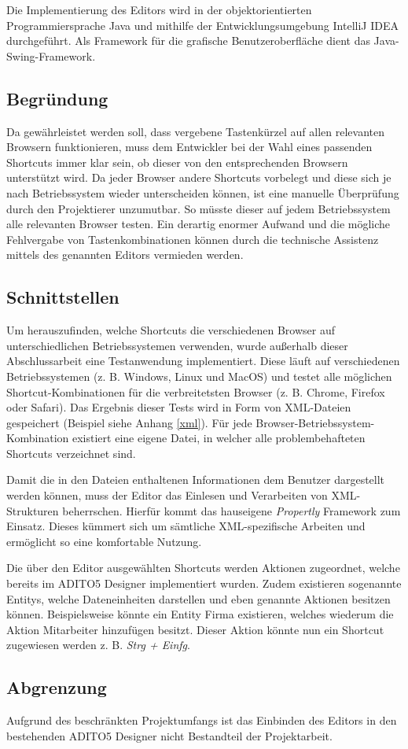 Die Implementierung des Editors wird in der objektorientierten Programmiersprache Java und mithilfe der Entwicklungsumgebung IntelliJ IDEA durchgeführt. Als Framework für die grafische Benutzeroberfläche dient das Java-Swing-Framework.

\subsection{Begründung}

Da gewährleistet werden soll, dass vergebene Tastenkürzel auf allen relevanten Browsern funktionieren, muss dem Entwickler bei der Wahl eines passenden Shortcuts immer klar sein, ob dieser von den entsprechenden Browsern unterstützt wird. Da jeder Browser andere Shortcuts vorbelegt und diese sich je nach Betriebssystem wieder unterscheiden können, ist eine manuelle Überprüfung durch den Projektierer unzumutbar. So müsste dieser auf jedem Betriebssystem alle relevanten Browser testen. Ein derartig enormer Aufwand und die mögliche Fehlvergabe von Tastenkombinationen können durch die technische Assistenz mittels des genannten Editors vermieden werden.

\subsection{Schnittstellen}
\label{schnittstellen} 

Um herauszufinden, welche Shortcuts die verschiedenen Browser auf unterschiedlichen Betriebssystemen verwenden, wurde außerhalb dieser Abschlussarbeit eine Testanwendung implementiert. Diese läuft auf verschiedenen Betriebssystemen (z. B. Windows, Linux und MacOS) und testet alle möglichen Shortcut-Kombinationen für die verbreitetsten Browser (z. B. Chrome, Firefox oder Safari). Das Ergebnis dieser Tests wird in Form von XML-Dateien gespeichert (Beispiel siehe Anhang \ref{xml}). Für jede Browser-Betriebssystem-Kombination existiert eine eigene Datei, in welcher alle problembehafteten Shortcuts verzeichnet sind.

Damit die in den Dateien enthaltenen Informationen dem Benutzer dargestellt werden können, muss der Editor das Einlesen und Verarbeiten von XML-Strukturen beherrschen. Hierfür kommt das hauseigene \emph{Propertly} Framework zum Einsatz. Dieses kümmert sich um sämtliche XML-spezifische Arbeiten und ermöglicht so eine komfortable Nutzung.

Die über den Editor ausgewählten Shortcuts werden Aktionen zugeordnet, welche bereits im ADITO5 Designer implementiert wurden. Zudem existieren sogenannte Entitys, welche Dateneinheiten darstellen und eben genannte Aktionen besitzen können. Beispielsweise könnte ein Entity \glqq Firma\grqq\xspace existieren, welches wiederum die Aktion \glqq Mitarbeiter hinzufügen\grqq\xspace besitzt. Dieser Aktion könnte nun ein Shortcut zugewiesen werden z. B. \emph{Strg + Einfg}.


\subsection{Abgrenzung}

Aufgrund des beschränkten Projektumfangs ist das Einbinden des Editors in den bestehenden ADITO5 Designer nicht Bestandteil der Projektarbeit.






\newpage